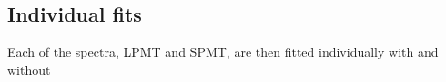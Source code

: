 \documentclass[../main.tex]{subfiles}
\begin{document}

\subsection{Individual fits}

Each of the spectra, LPMT and SPMT, are then fitted individually with and without 

%
%
%
%
%
%
%
%
%
%
%
%
%
%
\end{document}

